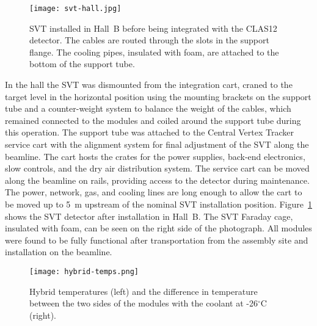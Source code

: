 \begin{figure}[hbt] 
\centering 
\texttt{[image: svt-hall.jpg]}
\caption{SVT installed in Hall~B before being integrated with the CLAS12 detector. The cables are routed
  through the slots in the support flange. The cooling pipes, insulated with  foam, are attached to the bottom
  of the support tube.}
\label{fig:svt-hall}
\end{figure}

In the hall the SVT was dismounted from the integration cart, craned to the target level in the horizontal
position using the mounting brackets on the support tube and a counter-weight system to balance the weight of
the cables, which remained connected to the modules and coiled around the support tube during this operation.
The support tube was attached to the Central Vertex Tracker service cart with the alignment system for final
adjustment of the SVT along the beamline. The cart hosts the crates for the power supplies, back-end electronics,
slow controls, and the dry air distribution system. The service cart can be moved along the beamline on rails,
providing access to the detector during maintenance. The power, network, gas, and cooling lines are long enough
to allow the cart to be moved up to 5~m upstream of the nominal SVT installation position. Figure~\ref{fig:svt-hall}
shows the SVT detector after installation in Hall~B. The SVT Faraday cage, insulated with foam, can be seen on the
right side of the photograph. All modules were found to be fully functional after transportation from the assembly
site and installation on the beamline. 

\begin{figure}[hbt] 
\centering 
\texttt{[image: hybrid-temps.png]}
\caption{Hybrid temperatures (left) and the difference in temperature between the two sides of the modules
  with the coolant at -26$^\circ$C (right).}
\label{fig:hybrid-temps}
\end{figure}

